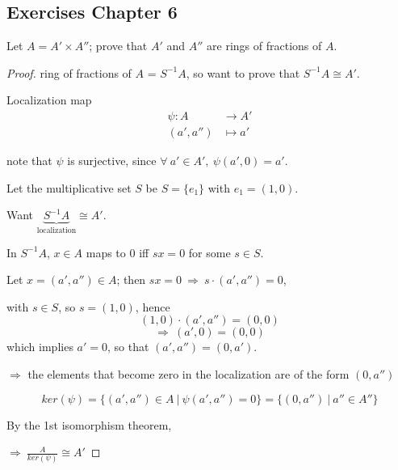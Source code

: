 \documentclass{article}
\theoremstyle{definition}
\newenvironment{ex}[1]
{\renewcommand\theinnerex{#1}\innerex}
{\endinnerex}
\begin{document}
\subsection{Exercises Chapter 6}

\begin{ex}{R.6.3.a}
  Let $A = A' \times A''$; prove that $A'$ and $A''$ are rings of fractions of $A$.
\end{ex}
\begin{proof}
  ring of fractions of $A$ = $S^{-1}A$, so want to prove that $S^{-1}A \cong A'$.

  Localization map
  \begin{align*}
    \psi: A &\longrightarrow A'\\
    (a', a'') &\longmapsto a'
  \end{align*}

  note that $\psi$ is surjective, since $\forall~ a' \in A',~ \psi(a', 0)=a'$.

  Let the multiplicative set $S$ be $S=\{ e_1 \}$ with $e_1 = (1,0)$.

  Want $\underbrace{S^{-1}A}_{\text{localization}} \cong A'$.

  In $S^{-1}A$, $x \in A$ maps to $0$ iff $s x = 0$ for some $s \in S$.
  
  Let $x=(a', a'')\in A$; then $sx=0 ~\Longrightarrow~ s \cdot (a', a'') =0$,

  with $s \in S$, so $s=(1,0)$, hence
  $$(1,0)\cdot(a',a'')=(0,0)$$
  $$\Longrightarrow~ (a', 0) = (0, 0)$$
  \hspace*{4em} which implies $a' = 0$, so that $(a', a'')=(0, a')$.

  $\Longrightarrow$ the elements that become zero in the localization are of the form $(0, a'')$

  $$ker(\psi) = \{ (a',a'')\in A ~|~ \psi(a', a'')=0 \} = \{(0, a'') ~|~ a'' \in A'' \}$$

  By the 1st isomorphism theorem, 

  
  $\Longrightarrow~ \frac{A}{ker(\psi)} \cong A'$



\end{proof}
\end{document}
